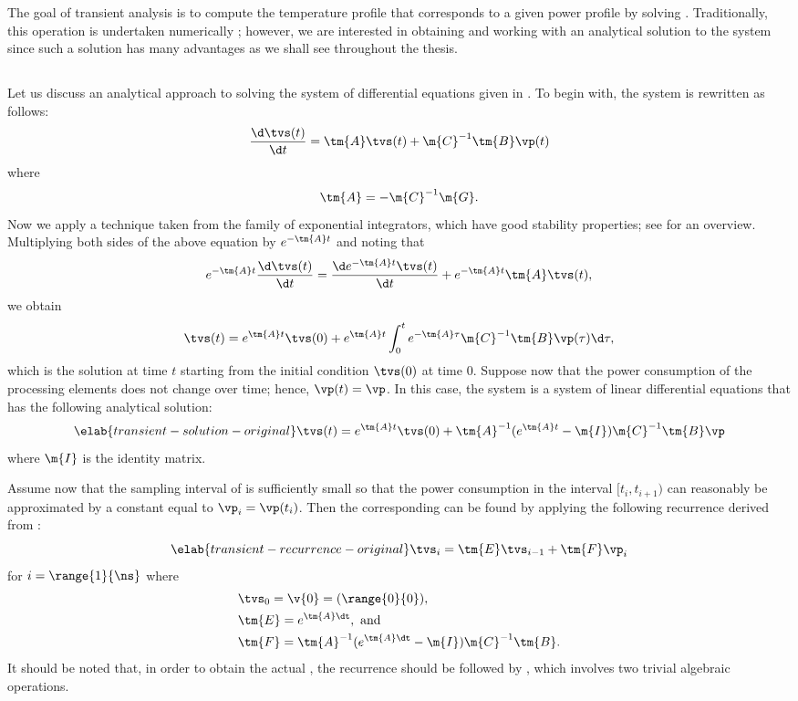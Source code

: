 The goal of transient analysis is to compute the temperature profile \mq that
corresponds to a given power profile \mp by solving
. Traditionally, this operation is undertaken
numerically \cite{skadron2003}; however, we are interested in obtaining and
working with an analytical solution to the system since such a solution has many
advantages as we shall see throughout the thesis.

\subsection{\priortitle}

Let us discuss an analytical approach to solving the system of differential
equations given in . To begin with, the
system is rewritten as follows:
\[
  \frac{\d \tvs(t)}{\d t} = \tm{A} \tvs(t) + \m{C}^{-1} \tm{B} \vp(t)
\]
where
\[
  \tm{A} = -\m{C}^{-1} \m{G}.
\]
Now we apply a technique taken from the family of exponential integrators, which
have good stability properties; see \cite{hochbruck2010} for an overview.
Multiplying both sides of the above equation by $e^{- \tm{A} t}$ and noting that
\[
  e^{-\tm{A} t} \frac{\d \tvs(t)}{\d t} = \frac{\d e^{-\tm{A} t} \tvs(t)}{\d t} + e^{-\tm{A} t} \tm{A} \tvs(t),
\]
we obtain
\[
  \tvs(t) = e^{\tm{A} t} \tvs(0) +  e^{\tm{A} t} \int_0^t e^{-\tm{A} \tau} \m{C}^{-1} \tm{B} \vp(\tau) \d \tau,
\]
which is the solution at time $t$ starting from the initial condition $\tvs(0)$
at time 0. Suppose now that the power consumption of the processing elements
does not change over time; hence, $\vp(t) = \vp$. In this case, the system is a
system of linear differential equations that has the following analytical
solution:
\begin{equation} \elab{transient-solution-original}
  \tvs(t) = e^{\tm{A} t} \tvs(0) + \tm{A}^{-1} (e^{\tm{A} t} - \m{I}) \m{C}^{-1} \tm{B} \vp
\end{equation}
where $\m{I}$ is the identity matrix.

Assume now that the sampling interval \dt of \mp is sufficiently small so that
the power consumption in the interval $[t_i, t_{i + 1})$ can reasonably be
approximated by a constant equal to $\vp_i = \vp(t_i)$. Then the corresponding
\mq can be found by applying the following recurrence derived from
:
\begin{equation} \elab{transient-recurrence-original}
  \tvs_{i} = \tm{E} \tvs_{i - 1} + \tm{F} \vp_i
\end{equation}
for $i = \range{1}{\ns}$ where
\begin{align*}
  & \tvs_0 = \v{0} = (\range{0}{0}), \\
  & \tm{E} = e^{\tm{A} \dt}, \text{ and} \\
  & \tm{F} = \tm{A}^{-1}(e^{\tm{A} \dt} - \m{I})\m{C}^{-1} \tm{B}.
\end{align*}
It should be noted that, in order to obtain the actual \mq, the recurrence
should be followed by , which involves two
trivial algebraic operations.

